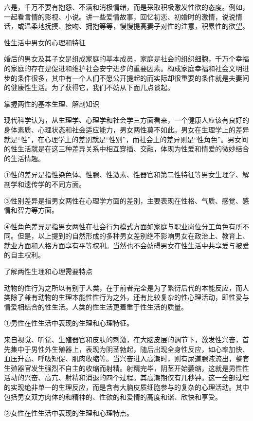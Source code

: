 \documentclass[12pt,UTF8]{ctexbook}
\begin{document}
六是，千万不要有抱怨、不满和消极情绪，而是采取积极激发性欲的态度。例如，一起看言情的影视、小说。讲一些爱情故事，回忆初恋、初婚时的激情，说说情话，或温柔地抚摸、接吻、拥抱等等，慢慢提高妻子对性的注意，积累性的欲望。





性生活中男女的心理和特征


婚后的男女及其子女是组成家庭的基本成员，家庭是社会的组织细胞，千万个幸福的家庭的存在是促进和维护社会安宁进步的重要因素。构成家庭幸福和社会文明进步的条件很多，其中有一个人们不愿公开提起的而实际却很重要的条件就是夫妻间的健康性生活。为了获得它，我们不妨从下面几点谈起。

掌握两性的基本生理、解剖知识

现代科学认为，从生理学、心理学和社会学三方面看来，一个健康人应该有良好的身体素质、心理状态和社会适应能力，男女两性莫不如此。男女在生理学上的差异就是“性”，在心理学上的差别就是“性别”，而社会上的差异则是“性角色”。男女间的性生活就是在这三种差异关系中相互穿插、交融，体现为性爱和情爱的微妙结合的生活情趣。

①性的差异是指性染色体、性腺、性激素、性器官和第二性特征等男女生理学、解剖学和遗传学的不同方面。

③性别差异是指男女两性在心理学方面的差别，主要表现在性格、气质、感觉、感情和智力等方面。

④性角色差异是指男女两性在社会行为模式方面如家庭与职业岗位分工角色有所不同。但是，以上提到的自然形成的多种男女差别绝不影响男女在政治上、教育上、就业方面和人格方面享有平等权利。当然也不会妨碍男女在性生活中共享爱与被爱的自主权利。

了解两性生理和心理需要特点

动物的性行为之所以有别于人类，在于前者完全是为了繁衍后代的本能反应，而人类除了兼有动物的生理本能性性行为之外，还有比较复杂的性心理活动，即性爱与情爱相结合的性生活。人类的性生活更着重于性生活的质量。

①男性在性生活中表现的生理和心理特征。

来自视觉、听觉、生殖器官和皮肤的刺激，在大脑皮层的调节下，激发性兴奋，首先集中于男性外生殖器上，表现为阴茎勃起，随后出现全身性反应，如心率加快、血压升高、呼吸短促、肌肉收缩等。当兴奋进入高潮时，则有尿道腺液流出，整套生殖器官发生强烈不自主的收缩而射精。射精完毕，阴茎开始萎缩，这就是男性性活动的兴奋、高亢、射精和消退的四个过程。其高潮期仅有几秒钟。这一全部过程的实现绝非单一的生理反应，而是含有大脑皮质细胞参与的复杂的心理活动。其中包括男女双方肉体的和精神的、性欲的和爱情的高度和谐、欣快和享受。

②女性在性生活中表现的生理和心理特点。
\end{document}
